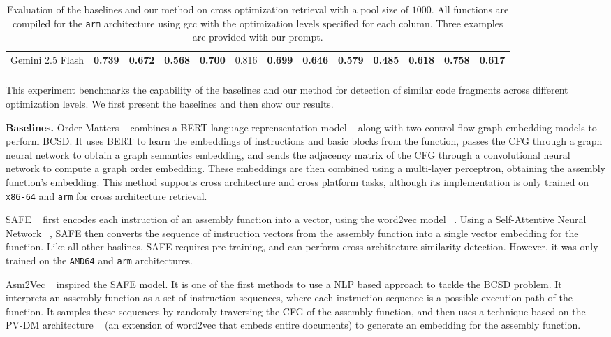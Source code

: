 {\begin{table}[t]
{\begin{tabular}{l|cccccc|cccccc}
    Gemini 2.5 Flash       & \bf 0.739  & \bf 0.672  & \bf 0.568  & \bf 0.700  & 0.816      & \bf 0.699   & \bf 0.646  & \bf 0.579  & \bf 0.485  & \bf 0.618  & \bf 0.758  & \bf 0.617 \\ \Xhline{2\arrayrulewidth}
    \end{tabular}
    }
    \caption{Evaluation of the baselines and our method on cross optimization retrieval with a pool size of \(1000\).
    All functions are compiled for the \texttt{arm} architecture using gcc with the optimization levels specified for each column.
    Three examples are provided with our prompt.}
    \label{x-opt}
    \end{table}
}

This experiment benchmarks the capability of the baselines and our method for detection of similar code fragments across
different optimization levels. We first present the baselines and then show our results.

\noindent \textbf{Baselines.} Order Matters ~\cite{OrderMatters} combines a BERT language reprensentation
model ~\cite{BERT} along with two control flow graph embedding models
to perform BCSD. It uses BERT to learn the embeddings of instructions and basic blocks from the function,
passes the CFG through a graph neural network to obtain a graph semantics embedding, and sends the adjacency
matrix of the CFG through a convolutional neural network to compute a graph order embedding. These embeddings
are then combined using a multi-layer perceptron, obtaining the assembly function's embedding. This method
supports cross architecture and cross platform tasks, although its implementation is only trained on \texttt{x86-64}
and \texttt{arm} for cross architecture retrieval.

SAFE ~\cite{SAFE} first encodes each instruction of an assembly function into a vector,
using the word2vec model ~\cite{word2vec}. Using a Self-Attentive Neural Network ~\cite{SANN}, SAFE then converts the sequence of instruction
vectors from the assembly function into a single vector embedding for the function. Like all other baslines, SAFE requires
pre-training, and can perform cross architecture similarity detection. However, it was only trained on the \texttt{AMD64}
and \texttt{arm} architectures.

Asm2Vec ~\cite{Asm2Vec} inspired the SAFE model. It is one of the first methods to use a NLP based approach to tackle
the BCSD problem. It interprets an assembly function as a set of instruction sequences, where each instruction sequence
is a possible execution path of the function. It samples these sequences by randomly traversing the CFG of the assembly
function, and then uses a technique based on the PV-DM architecture ~\cite{PV-DM} (an extension of word2vec that embeds entire documents)
to generate an embedding for the assembly function.

